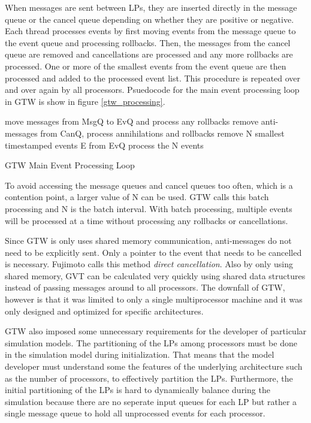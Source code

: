 \documentclass[11pt]{book}
\begin{document}
\noindent
When messages are sent between LPs, they are inserted directly in the message queue or
the cancel queue depending on whether they are positive or negative.  Each thread processes events
by first moving events from the message queue to the event queue and processing rollbacks.  Then,
the messages from the cancel queue are removed and cancellations are processed and any more
rollbacks are processed.  One or more of the smallest events from the event queue are then processed
and added to the processed event list.  This procedure is repeated over and over again by all processors.
Psuedocode for the main event processing loop in GTW is show in figure \ref{gtw_processing}.

\begin{algorithm}
\DontPrintSemicolon
     {
        move messages from MsgQ to EvQ and process any rollbacks\;
        remove anti-messages from CanQ, process annihilations and rollbacks\;
        remove N smallest timestamped events E from EvQ\;
        process the N events\;
    }
\caption{GTW Main Event Processing Loop\cite{das-94}\cite{fujimoto-94}\label{gtw_processing}}
\end{algorithm}

\noindent
To avoid accessing the message queues and cancel queues too often, which is a contention point,
a larger value of N can be used.  GTW calls this batch processing and N is the batch interval.
With batch processing, multiple events will be processed at a time without processing any
rollbacks or cancellations.

Since GTW is only uses shared memory communication, anti-messages do not need to be explicitly
sent.  Only a pointer to the event that needs to be cancelled is necessary.  Fujimoto calls
this method \emph{direct cancellation}.  Also by only using shared memory, GVT can be calculated
very quickly using shared data structures instead of passing messages around to all processors.
The downfall of GTW, however is that it was limited to only a single multiprocessor machine and
it was only designed and optimized for specific architectures.

GTW also imposed some unnecessary requirements for the developer of particular simulation
models.  The partitioning of the LPs among processors must be done in the simulation model
during initialization.  That means that the model developer must understand some the features of
the underlying architecture such as the number of processors, to effectively partition the
LPs.  Furthermore, the initial partitioning of the LPs is hard to dynamically balance during
the simulation because there are no seperate input queues for each LP but rather a single
message queue to hold all unprocessed events for each processor.
\end{document}

